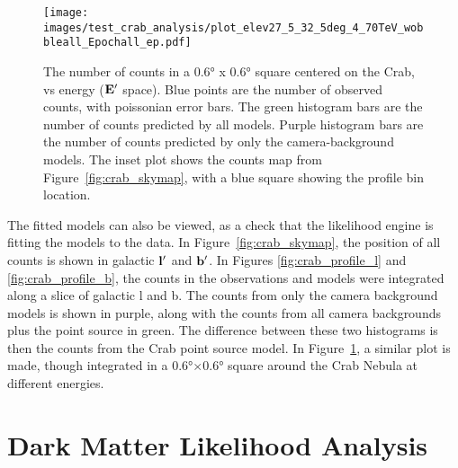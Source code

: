   \begin{figure}[h]
    \centering
    \texttt{[image: images/test\_crab\_analysis/plot\_elev27\_5\_32\_5deg\_4\_70TeV\_wobbleall\_Epochall\_ep.pdf]}
    \caption[Crab Profile in Energy]
    {
      The number of counts in a \ang{0.6} x \ang{0.6} square centered on the Crab, vs energy ($\mathbf{E'}$ space).
      Blue points are the number of observed counts, with poissonian error bars.
      The green histogram bars are the number of counts predicted by all models.
      Purple histogram bars are the number of counts predicted by only the camera-background models.
      The inset plot shows the counts map from Figure~\ref{fig:crab_skymap}, with a blue square showing the profile bin location.
    }
    \label{fig:crab_profile_energy}
  \end{figure}
    
  The fitted models can also be viewed, as a check that the likelihood engine is fitting the models to the data.
  In Figure~\ref{fig:crab_skymap}, the position of all counts is shown in galactic $\mathbf{l'}$ and $\mathbf{b'}$.
  In Figures \ref{fig:crab_profile_l} and \ref{fig:crab_profile_b}, the counts in the observations and models were integrated along a slice of galactic l and b.
  The counts from only the camera background models is shown in purple, along with the counts from all camera backgrounds plus the point source in green.
  The difference between these two histograms is then the counts from the Crab point source model.
  In Figure~\ref{fig:crab_profile_energy}, a similar plot is made, though integrated in a \ang{0.6}$\times$\ang{0.6} square around the Crab Nebula at different energies.

  \FloatBarrier

\section{Dark Matter Likelihood Analysis}\label{sec:dmlike}
  
